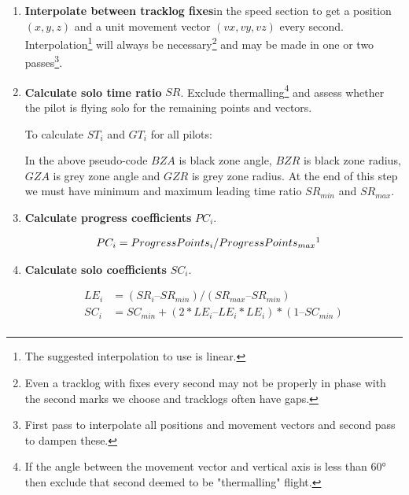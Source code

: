 \documentclass[gap.tex]{subfiles}
\begin{document}
\begin{enumerate}
    \item \textbf{Interpolate between tracklog fixes}\footnotemark in the speed
        section to get a position \((x, y, z)\) and a unit movement vector
        \((vx, vy, vz)\) every second. Interpolation\footnote{The
        suggested interpolation to use is linear.} will always be
        necessary\footnote{Even a tracklog with fixes every second may not be
        properly in phase with the second marks we choose and tracklogs often
        have gaps.} and may be made in one or two passes\footnote{First pass to
        interpolate all positions and movement vectors and second pass to
        dampen these.}.

    \item \textbf{Calculate solo time ratio} \(SR\). Exclude
        thermalling\footnote{If the angle between the movement vector and
        vertical axis is less than 60° then exclude that second deemed to be
        "thermalling" flight.} and assess whether the pilot is flying solo for
        the remaining points and vectors.
    
        To calculate \(ST_i\) and \(GT_i\) for all pilots:

        In the above pseudo-code \(BZA\) is black zone angle, \(BZR\) is black
        zone radius, \(GZA\) is grey zone angle and \(GZR\) is grey zone
        radius. At the end of this step we must have minimum and maximum
        leading time ratio \(SR_{min}\) and \(SR_{max}\).

    \item \textbf{Calculate progress coefficients} \(PC_i\).
        
        \begin{align*}
            PC_i &= ProgressPoints_i / ProgressPoints_{max}\footnotemark
        \end{align*}

    \item \textbf{Calculate solo coefficients} \(SC_i\).
        
        \begin{align*}
            LE_i &= (SR_i – SR_{min}) / (SR_{max} – SR_{min}) \\
            SC_i &= SC_{min} + (2*LE_i – LE_i * LE_i) * (1 – SC_{min}) \\
        \end{align*}
            

\end{enumerate}
\end{document}
